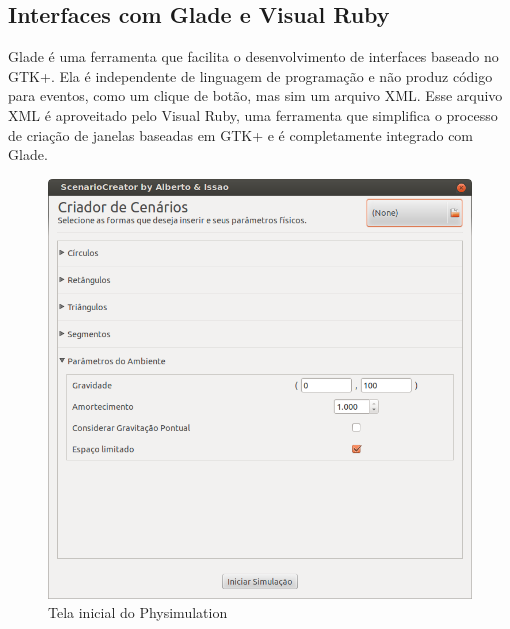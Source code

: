 \subsection{Interfaces com Glade e Visual Ruby}
Glade é uma ferramenta que facilita o desenvolvimento de interfaces baseado no GTK+. Ela é independente de linguagem de programação
e não produz código para eventos, como um clique de botão, mas sim um arquivo XML. Esse arquivo XML é aproveitado pelo Visual Ruby, uma ferramenta que simplifica 
o processo de criação de janelas baseadas em GTK+ e é completamente integrado com Glade.

\begin{figure}[!htbp]
  \includegraphics[scale=0.5]{telaInicial.png}
  \caption{Tela inicial do Physimulation}
\end{figure}
